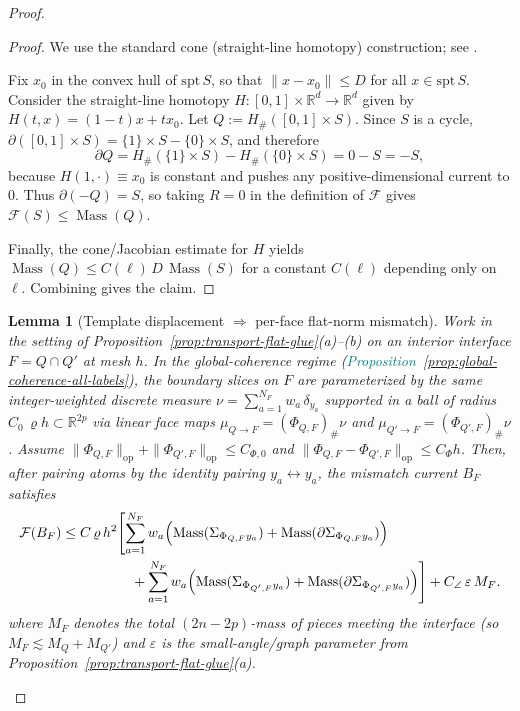 \documentclass[11pt]{article}
\newcommand{\REVMZ}[1]{\textcolor{teal}{#1}}  %
\numberwithin{equation}{section}  %
\theoremstyle{plain}
\newtheorem{lemma}[theorem]{Lemma}
\theoremstyle{definition}
\theoremstyle{remark}
\newcommand{\R}{\mathbb{R}}
\DeclareMathOperator{\Mass}{Mass}
\begin{document}
\begin{proof}
\begin{proof}
We use the standard cone (straight-line homotopy) construction; see \cite{Fed69}.

Fix $x_0$ in the convex hull of $\mathrm{spt}\,S$, so that $\|x-x_0\|\le D$ for all $x\in \mathrm{spt}\,S$.
Consider the straight-line homotopy $H:[0,1]\times\R^d\to\R^d$ given by
\(
H(t,x)=(1-t)x+t x_0.
\)
Let $Q:=H_\#([0,1]\times S)$.
Since $S$ is a cycle, $\partial([0,1]\times S)=\{1\}\times S-\{0\}\times S$, and therefore
\[
\partial Q
=H_\#(\{1\}\times S)-H_\#(\{0\}\times S)
=0-S
=-S,
\]
because $H(1,\cdot)\equiv x_0$ is constant and pushes any positive-dimensional current to $0$.
Thus $\partial(-Q)=S$, so taking $R=0$ in the definition of $\mathcal F$ gives $\mathcal F(S)\le \Mass(Q)$.

Finally, the cone/Jacobian estimate for $H$ yields $\Mass(Q)\le C(\ell)\,D\,\Mass(S)$ for a constant $C(\ell)$ depending only on $\ell$.
Combining gives the claim.
\end{proof}

\begin{lemma}[Template displacement $\Rightarrow$ per-face flat-norm mismatch]\label{lem:template-displacement}
Work in the setting of Proposition~\ref{prop:transport-flat-glue}\textnormal{(a)}--\textnormal{(b)} on an interior interface $F=Q\cap Q'$ at mesh $h$.
In the global-coherence regime (\REVMZ{Proposition~\ref{prop:global-coherence-all-labels}}), the boundary slices on $F$ are parameterized by the \emph{same} integer-weighted discrete measure
$\nu=\sum_{a=1}^{N_F} w_a\,\delta_{y_a}$ supported in a ball of radius $C_0\,\varrho h\subset\R^{2p}$ via linear face maps
$\mu_{Q\to F}=(\Phi_{Q,F})_\#\nu$ and $\mu_{Q'\to F}=(\Phi_{Q',F})_\#\nu$.
Assume $\|\Phi_{Q,F}\|_{\mathrm{op}}+\|\Phi_{Q',F}\|_{\mathrm{op}}\le C_{\Phi,0}$ and $\|\Phi_{Q,F}-\Phi_{Q',F}\|_{\mathrm{op}}\le C_\Phi h$.
Then, after pairing atoms by the identity pairing $y_a\leftrightarrow y_a$, the mismatch current $B_F$ satisfies
\begin{align*}
\mathcal F(B_F)
&\le C\,\varrho\,h^2\Biggl[
\sum_{a=1}^{N_F} w_a\Bigl(\Mass(\Sigma_{\Phi_{Q,F}y_a})+\Mass(\partial\Sigma_{\Phi_{Q,F}y_a})\Bigr) \\
&\qquad\qquad\quad
+\sum_{a=1}^{N_F} w_a\Bigl(\Mass(\Sigma_{\Phi_{Q',F}y_a})+\Mass(\partial\Sigma_{\Phi_{Q',F}y_a})\Bigr)
\Biggr]
+ C_{\angle}\,\varepsilon\,M_F.
\end{align*}
where $M_F$ denotes the total $(2n-2p)$-mass of pieces meeting the interface (so $M_F\lesssim M_Q+M_{Q'}$) and
$\varepsilon$ is the small-angle/graph parameter from Proposition~\ref{prop:transport-flat-glue}\textnormal{(a)}.
\end{lemma}


\end{proof}
\end{document}

